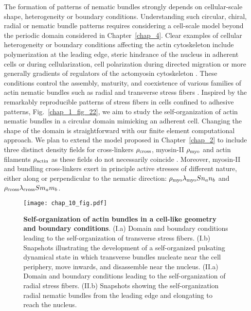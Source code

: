 The formation of patterns of nematic bundles strongly depends on cellular-scale shape, heterogeneity or boundary conditions. Understanding such circular, chiral, radial or nematic bundle patterns requires considering a cell-scale model beyond the periodic domain considered in Chapter~\ref{chap_4}. Clear examples of cellular heterogeneity or boundary conditions affecting the actin cytoskeleton include polymerization at the leading edge, steric hindrance of the nucleus in adherent cells or during cellularization, cell polarization during directed migration or more generally gradients of regulators of the actomyosin cytoskeleton  \cite{dudin2019,tojkander2015}. These conditions control the assembly, maturity, and coexistence of various families of actin nematic bundles such as radial and transverse stress fibers \cite{tojkander2015}. Inspired by the remarkably reproducible patterns of stress fibers in cells confined to adhesive patterns, Fig.~\ref{chap_1_fig_22}, we aim to study the self-organization of actin nematic bundles in a circular domain mimicking an adherent cell. Changing the shape of the domain is straightforward with our finite element computational approach. We plan to extend the model proposed in Chapter~\ref{chap_2} to include three distinct density fields for cross-linkers $\rho_{\rm cross}$, myosin-II  $\rho_{\rm myo}$ and actin filaments $\rho_{\rm actin}$ as these fields do not necessarily coincide \cite{lehtimaki2021}. Moreover, myosin-II  and bundling cross-linkers exert in principle active stresses of different nature, either along or perpendicular to the nematic direction: $ \rho_{\rm myo} \lambda_{\rm myo} S n_a n_b$ and  $\rho_{\rm cross} \lambda_{\rm cross} S m_a m_b$.

\begin{figure}[H]
	\centering
	\texttt{[image: chap\_10\_fig.pdf]}
	\caption{\textbf{Self-organization of actin bundles in a cell-like geometry and boundary conditions}. (I.a) Domain and boundary conditions leading to the self-organization of transverse stress fibers. (I.b) Snapshots illustrating the development of a self-organized pulsating dynamical state in which transverse bundles nucleate near the cell periphery, move inwards, and disassemble near the nucleus. (II.a) Domain and boundary conditions leading to the self-organization of radial stress fibers. (II.b) Snapshots showing the self-organization radial nematic bundles from the leading edge and elongating to reach the nucleus.}
	\label{fig::1_chap10}
\end{figure}

